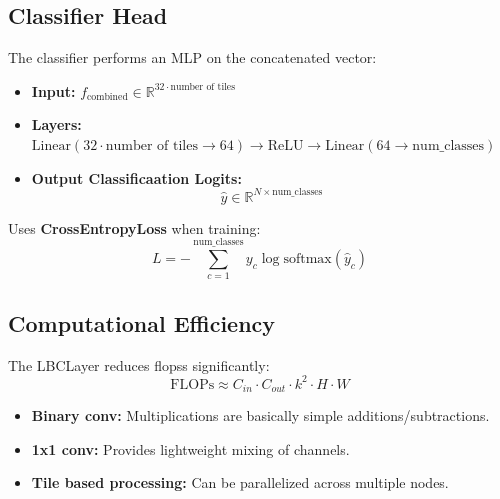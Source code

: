 \subsection*{Classifier Head}
The classifier performs an MLP on the concatenated vector:
\begin{itemize}
    \item \textbf{Input:} $f_{\text{combined}} \in \mathbb{R}^{32 \cdot \text{number of tiles}}$
    \item \textbf{Layers:} $\text{Linear}(32 \cdot \text{number of tiles} \rightarrow 64) \rightarrow \text{ReLU} \rightarrow \text{Linear}(64 \rightarrow \text{num\_classes})$
    \item \textbf{Output Classificaation Logits:}
     \begin{equation}
    \hat{y} \in \mathbb{R}^{N \times \text{num\_classes}}
    \end{equation}
\end{itemize}
Uses \textbf{CrossEntropyLoss} when training:
\begin{equation}
L = -\sum_{c=1}^{\text{num\_classes}} y_c \log \text{softmax}(\hat{y}_c)
\end{equation}

\subsection*{Computational Efficiency}
The LBCLayer reduces \glspl{flops} significantly:
\begin{equation}
\text{FLOPs} \approx C_{in} \cdot C_{out} \cdot k^2 \cdot H \cdot W
\end{equation}
\begin{itemize}
    \item \textbf{Binary conv:} Multiplications are basically simple additions/subtractions.
    \item \textbf{1x1 conv:} Provides lightweight mixing of channels.
    \item \textbf{Tile based processing:} Can be parallelized across multiple nodes.
\end{itemize}

